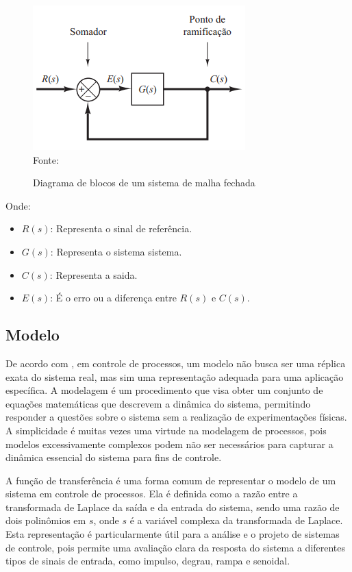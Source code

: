     \begin{figure}[H]
    	\centering
    	\caption{Diagrama de blocos de um sistema de malha fechada}
    	\includegraphics[scale=1]{figuras/closed_loop}
    	\label{fig:closed_loop}
    	\\
        \vspace{0cm}\hspace{0cm}\small{Fonte: \cite[Fig 2.3]{ogata2010engenharia}}
    \end{figure}

Onde:
\begin{itemize}
\item $R(s)$: Representa o sinal de referência.
\item $G(s)$: Representa o sistema sistema.
\item $C(s)$: Representa a saida.
\item $E(s)$: É o erro ou a diferença entre $R(s)$ e $C(s)$.
\end{itemize}

\subsection{Modelo}

De acordo com \cite{CoelhoIdentificacao}, em controle de processos, um modelo não busca ser uma réplica exata do
sistema real, mas sim uma representação adequada para uma aplicação específica.
A modelagem é um procedimento que visa obter um conjunto de equações matemáticas que descrevem a dinâmica do sistema,
permitindo responder a questões sobre o sistema sem a realização de experimentações físicas.
A simplicidade é muitas vezes uma virtude na modelagem de processos, pois modelos excessivamente complexos podem
não ser necessários para capturar a dinâmica essencial do sistema para fins de controle.

A função de transferência é uma forma comum de representar o modelo de um sistema em controle de processos.
Ela é definida como a razão entre a transformada de Laplace da saída e da entrada do sistema,
sendo uma razão de dois polinômios em $s$, onde $s$ é a variável complexa da transformada de Laplace.
Esta representação é particularmente útil para a análise e o projeto de sistemas de controle,
pois permite uma avaliação clara da resposta do sistema a diferentes tipos de sinais de entrada,
como impulso, degrau, rampa e senoidal.

